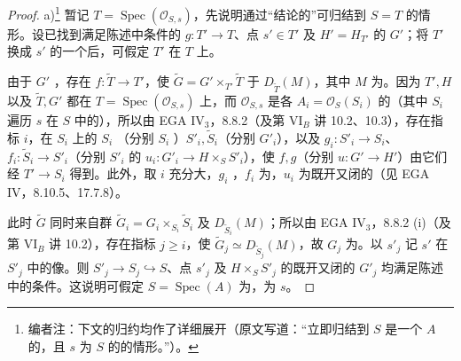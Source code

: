\begin{proof}
a)\footnote[27]{编者注：下文的归约均作了详细展开（原文写道：“立即归结到 $S$ 是一个 $A$ 的，且 $s$ 为 $S$ 的的情形。”）。} 暂记 $T=\operatorname{Spec}(\mathscr O_{S,s})$，先说明通过“结论的”可归结到 $S=T$ 的情形。设已找到满足陈述中条件的 $g:T'\to T$、点 $s'\in T'$ 及 $H'=H_{T'}$ 的 $G'$；将 $T'$ 换成 $s'$ 的一个后，可假定 $T'$ 在 $T$ 上。

由于 $G'$ ，存在 $f:\widetilde T\to T'$，使 $\widetilde G=G'\times_{T'}\widetilde T$ 于 $D_{\widetilde T}(M)$，其中 $M$ 为。因为 $T',H$ 以及 $\widetilde T,G'$ 都在 $T=\operatorname{Spec}(\mathscr O_{S,s})$ 上，而 $\mathscr O_{S,s}$ 是各 $A_i=\mathscr O_S(S_i)$ 的（其中 $S_i$ 遍历 $s$ 在 $S$ 中的），所以由 EGA IV$_3$，8.8.2（及第 VI$_B$ 讲 10.2、10.3），存在指标 $i$，在 $S_i$ 上的 $S_i$ （分别 $S_i$ ）$S'_i,\widetilde S_i$（分别 $G'_i$），以及 $g_i:S'_i\to S_i$、$f_i:\widetilde S_i\to S'_i$（分别 $S'_i$ 的 $u_i:G'_i\to H\times_S S'_i$），使 $f,g$（分别 $u:G'\to H'$）由它们经 $T'\to S_i$ 得到。此外，取 $i$ 充分大，$g_i$ ，$f_i$ 为，$u_i$ 为既开又闭的（见 EGA IV，8.10.5、17.7.8）。

此时 $\widetilde G$ 同时来自群 $\widetilde G_i=G_i\times_{S_i}\widetilde S_i$ 及 $D_{\widetilde S_i}(M)$；所以由 EGA IV$_3$，8.8.2 (i)（及第 VI$_B$ 讲 10.2），存在指标 $j\geq i$，使 $\widetilde G_j\simeq D_{\widetilde S_j}(M)$，故 $G_j$ 为。以 $s'_j$ 记 $s'$ 在 $S'_j$ 中的像。则 $S'_j\to S_j\hookrightarrow S$、点 $s'_j$ 及 $H\times_S S'_j$ 的既开又闭的 $G'_j$ 均满足陈述中的条件。这说明可假定 $S=\operatorname{Spec}(A)$ 为，为 $s$。


\end{proof}
